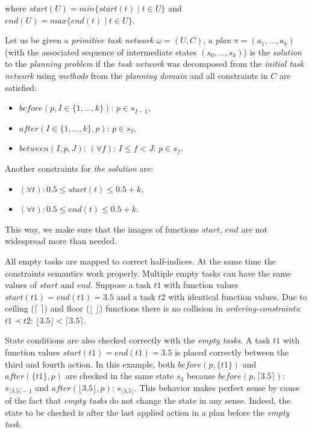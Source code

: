 \noindent
where $start(U) = min\{start(t) \; | \; t \in U\}$ and $end(U) = max\{end(t) \; | \; t \in U\}$.

\medskip\noindent
Let us be given a \emph{primitive task network} $\omega = (U, C)$, a \emph{plan} $\pi = (a_1, \dots, a_k)$ (with the associated sequence of intermediate states $(s_0, \dots, s_k)$) is the \emph{solution} to the \emph{planning problem} if the \emph{task network} was decomposed from the \emph{initial task network} using \emph{methods} from the \emph{planning domain} and all constraints in $C$ are satisfied:

\begin{itemize}
    \item $before(p, I \in \{1, \dots, k\})$: $p \in s_{I - 1}$,

    \item $after(I \in \{1, \dots, k\}, p)$: $p \in s_{I}$,

    \item $between(I, p, J)$: $(\forall f)$: $I \leq f < J$: $p \in s_f$.
\end{itemize}

\medskip\noindent
Another constraints for \emph{the solution} are:

\begin{itemize}
    \item $(\forall t): 0.5 \leq start(t) \leq 0.5 + k$,
    \item $(\forall t): 0.5 \leq end(t) \leq 0.5 + k$.
\end{itemize}

This way, we make sure that the images of functions $start$, $end$ are not widespread more than needed.

\medskip\noindent
All empty tasks are mapped to correct half-indices. At the same time the constraints semantics work properly. Multiple empty tasks can have the same values of $start$ and $end$. Suppose a task $t1$ with function values $start(t1) = end(t1) = 3.5$ and a task $t2$ with identical function values. Due to ceiling ($\lceil \; \rceil$) and floor ($\lfloor \; \rfloor$) functions there is no collision in \emph{ordering-constraints}: $t1 \prec t2$: $\lfloor 3.5 \rfloor < \lceil 3.5 \rceil$. 

\noindent
State conditions are also checked correctly with the \emph{empty tasks}. A task $t1$ with function values $start(t1) = end(t1) = 3.5$ is placed correctly between the third and fourth action. In this example, both $before(p, \{ t1 \})$ and $after(\{ t1 \}, p)$ are checked in the same state $s_3$ because $before(p, \lceil 3.5 \rceil)$: $s_{\lceil 3.5 \rceil - 1}$ and $after(\lfloor 3.5 \rfloor, p)$: $s_{\lfloor 3.5 \rfloor}$. This behavior makes perfect sense by cause of the fact that \emph{empty tasks} do not change the state in any sense. Indeed, the state to be checked is after the last applied action in a plan before the \emph{empty task}.

